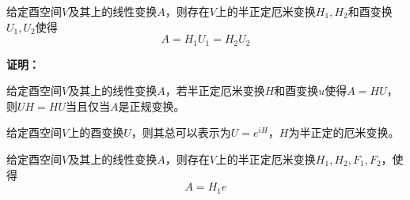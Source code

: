 
\begin{theorem}{}
给定酉空间$V$及其上的线性变换$A$，则存在$V$上的半正定厄米变换$H_1,H_2$和酉变换$U_1,U_2$使得
\begin{equation}
A=H_1U_1=H_2U_2
\end{equation}
\end{theorem}
\textbf{证明：}
\begin{theorem}{}
给定酉空间$V$及其上的线性变换$A$，若半正定厄米变换$H$和酉变换$u$使得$A=HU$，则$UH=HU$当且仅当$A$是正规变换。
\end{theorem}
\begin{theorem}{}
给定酉空间$V$上的酉变换$U$，则其总可以表示为$U=e^{iH}$，$H$为半正定的厄米变换。
\end{theorem}
\begin{corollary}{}
给定酉空间$V$及其上的线性变换$A$，则存在$V$上的半正定厄米变换$H_1,H_2,F_1,F_2$，使得
\begin{equation}
A=H_1e
\end{equation}
\end{corollary}
